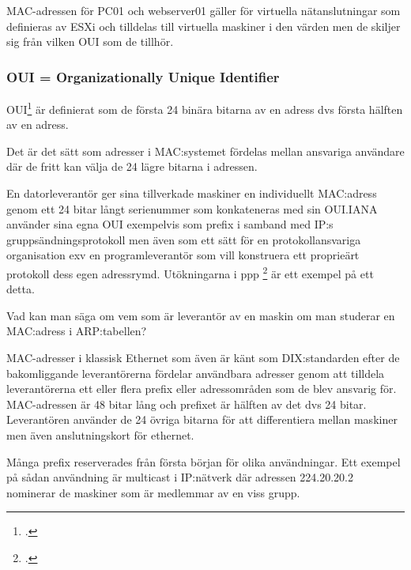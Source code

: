 \documentclass[swedish,10pt,a4paper]{article}
\begin{document}
MAC-adressen för PC01 och webserver01 gäller för virtuella nätanslutningar som
definieras av ESXi och tilldelas till virtuella maskiner i den värden
men de skiljer sig från vilken OUI som de tillhör.

\subsubsection{OUI = Organizationally Unique Identifier}
\label{subsubsec:oui}

OUI\footcite{rfc5342} är definierat som de första 24 binära bitarna av en adress dvs första
hälften av en adress.

Det är det sätt som adresser i MAC:systemet fördelas mellan ansvariga användare
där de fritt kan välja de 24 lägre bitarna i adressen.

En datorleverantör ger sina tillverkade maskiner en individuellt MAC:adress genom
ett 24 bitar långt serienummer som konkateneras med sin OUI.\@ IANA använder
sina egna OUI exempelvis som prefix i samband med IP:s gruppsändningsprotokoll men även
som ett sätt för en protokollansvariga organisation exv en programleverantör
som vill konstruera ett proprieärt protokoll dess egen adressrymd. Utökningarna i
ppp \footcite{rfc2153} är ett exempel på ett detta.


Vad kan man säga om vem som är leverantör av en maskin om man studerar en MAC:adress i ARP:tabellen?


MAC-adresser i klassisk Ethernet som även är känt som DIX:standarden efter
de bakomliggande leverantörerna fördelar användbara adresser genom att tilldela
leverantörerna ett eller flera prefix eller adressområden som de blev ansvarig för. MAC-adressen är 48 bitar lång
och prefixet är hälften av det dvs 24 bitar. Leverantören använder
de 24 övriga bitarna för att differentiera mellan maskiner men även anslutningskort för ethernet.

Många prefix reserverades från första början för olika användningar. Ett exempel på
sådan användning är multicast i IP:nätverk där adressen 224.20.20.2 nominerar
de maskiner som är medlemmar av en viss grupp.
\end{document}
